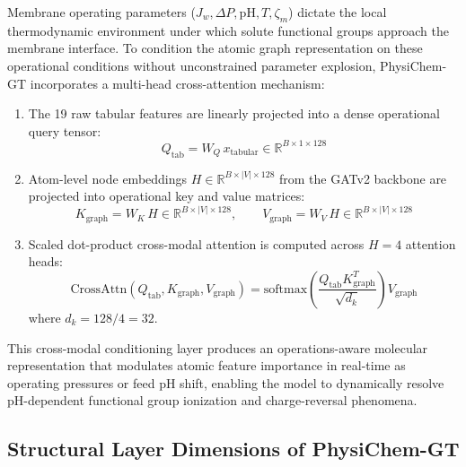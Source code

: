 \documentclass[11pt]{article}
\begin{document}
Membrane operating parameters ($J_w, \Delta P, \mathrm{pH}, T, \zeta_m$) dictate the local thermodynamic environment under which solute functional groups approach the membrane interface. To condition the atomic graph representation on these operational conditions without unconstrained parameter explosion, PhysiChem-GT incorporates a multi-head cross-attention mechanism:
\begin{enumerate}[leftmargin=1.0cm]
    \item The 19 raw tabular features are linearly projected into a dense operational query tensor:
    \begin{equation}
    Q_{\mathrm{tab}} = W_Q \, x_{\mathrm{tabular}} \in \mathbb{R}^{B \times 1 \times 128}
    \end{equation}
    \item Atom-level node embeddings $H \in \mathbb{R}^{B \times |V| \times 128}$ from the GATv2 backbone are projected into operational key and value matrices:
    \begin{equation}
    K_{\mathrm{graph}} = W_K \, H \in \mathbb{R}^{B \times |V| \times 128}, \qquad V_{\mathrm{graph}} = W_V \, H \in \mathbb{R}^{B \times |V| \times 128}
    \end{equation}
    \item Scaled dot-product cross-modal attention is computed across $H = 4$ attention heads:
    \begin{equation}
    \mathrm{CrossAttn}(Q_{\mathrm{tab}}, K_{\mathrm{graph}}, V_{\mathrm{graph}}) = \mathrm{softmax}\left( \frac{Q_{\mathrm{tab}} K_{\mathrm{graph}}^T}{\sqrt{d_k}} \right) V_{\mathrm{graph}}
    \label{eq:s_cross_attn}
    \end{equation}
    where $d_k = 128 / 4 = 32$.
\end{enumerate}
This cross-modal conditioning layer produces an operations-aware molecular representation that modulates atomic feature importance in real-time as operating pressures or feed pH shift, enabling the model to dynamically resolve pH-dependent functional group ionization and charge-reversal phenomena.

\subsection{Structural Layer Dimensions of PhysiChem-GT}
\end{document}
